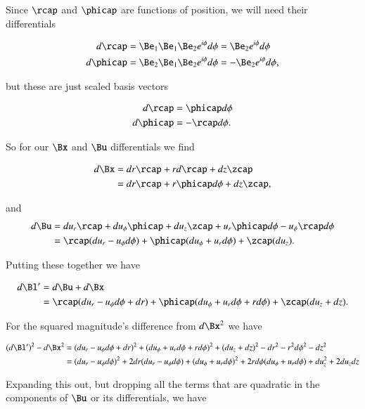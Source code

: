 Since $\rcap$ and $\phicap$ are functions of position, we will need their differentials

\begin{align}\label{eqn:continuumL2:410}
d\rcap &= \Be_1 \Be_1 \Be_2 e^{i\phi} d\phi = \Be_2 e^{i \phi} d\phi \\
d\phicap &= \Be_2 \Be_1 \Be_2 e^{i\phi} d\phi = -\Be_2 e^{i \phi} d\phi,
\end{align}

but these are just scaled basis vectors

\begin{align}\label{eqn:continuumL2:430}
d\rcap &= \phicap d\phi \\
d\phicap &= -\rcap d\phi.
\end{align}

So for our $\Bx$ and $\Bu$ differentials we find

\begin{align*}
d\Bx 
&= dr \rcap + r d\rcap + dz \zcap \\
&= dr \rcap + r \phicap d\phi + dz \zcap,
\end{align*}

and
\begin{align*}
d\Bu 
&= du_r \rcap + du_\phi \phicap + du_z \zcap 
+ u_r \phicap d\phi - u_\phi \rcap d\phi \\
&= \rcap( du_r - u_\phi d\phi )
+ \phicap ( du_\phi + u_r d\phi )
+ \zcap ( du_z ).
\end{align*}

Putting these together we have

\begin{align*}
d\Bl' 
&= d\Bu + d\Bx 
\\
&= \rcap( du_r - u_\phi d\phi + dr )
+ \phicap ( du_\phi + u_r d\phi + r d\phi )
+ \zcap ( du_z + dz ).
\end{align*}

For the squared magnitude's difference from $d\Bx^2$ we have

\begin{align*}
(d\Bl')^2 - d\Bx^2
&= 
( du_r - u_\phi d\phi + dr )^2
+ ( du_\phi + u_r d\phi + r d\phi )^2
+ ( du_z + dz )^2
-dr^2 - r^2 d\phi^2 - dz^2 \\
&=
( du_r - u_\phi d\phi )^2 
+ 2 dr ( du_r - u_\phi d\phi )
+ ( du_\phi + u_r d\phi )^2
+ 2 r d\phi ( du_\phi + u_r d\phi )
+ du_z^2 + 2 du_z dz \\
\end{align*}

Expanding this out, but dropping all the terms that are quadratic in the components of $\Bu$ or its differentials, we have

